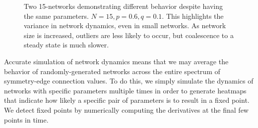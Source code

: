 \begin{figure}[h]
\begin{subfigure}{0.45\textwidth}
         \label{fig:1b}
     \end{subfigure}
     \caption{Two 15-networks demonstrating different behavior despite having the same parameters. $N=15, p=0.6, q=0.1$. This highlights the variance in network dynamics, even in small networks. As network size is increased, outliers are less likely to occur, but coalescence to a steady state is much slower.}
     \label{fig:1}
\end{figure}

Accurate simulation of network dynamics means that we may average the behavior of randomly-generated networks across the entire spectrum of symmetry-edge connection values. To do this, we simply simulate the dynamics of networks with specific parameters multiple times in order to generate heatmaps that indicate how likely a specific pair of parameters is to result in a fixed point. We detect fixed points by numerically computing the derivatives at the final few points in time.
